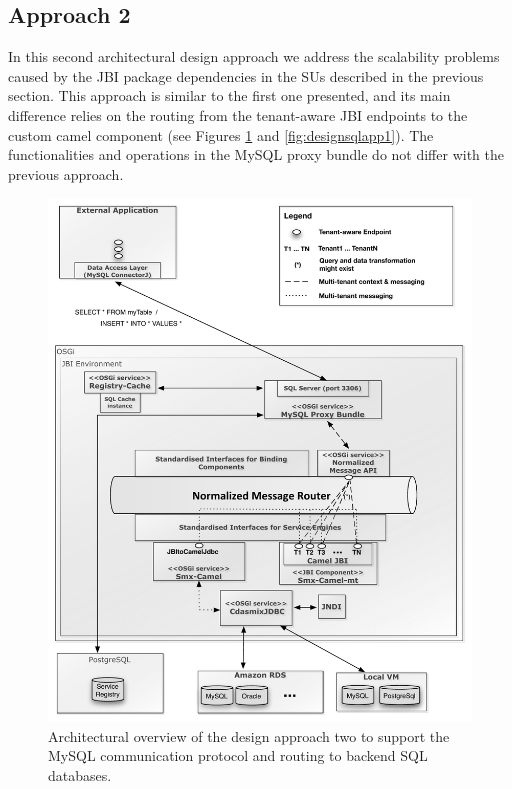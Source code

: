 \subsection{Approach 2}

In this second architectural design approach we address the scalability problems caused by the \ac{JBI} package dependencies in the \ac{SU}s described in the previous section. This approach is similar to the first one presented, and its main difference relies on the routing from the tenant-aware \ac{JBI} endpoints to the custom camel component  (see Figures \ref{fig:designsqlapp2} and \ref{fig:designsqlapp1}). The functionalities and operations in the MySQL proxy bundle do not differ with the previous approach.
 
\begin{figure}[htb]
	\centering
		\includegraphics[clip, scale=0.6]{./gfx/sqlApproach/sqlApproachv3_doc.pdf}
	\caption[SQL Support Approach 2]{Architectural overview of the design approach two to support the MySQL communication protocol and routing to backend \ac{SQL} databases.}
	\label{fig:designsqlapp2}
\end{figure}

